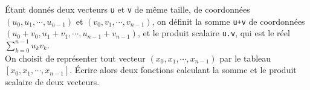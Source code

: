Étant donnés deux vecteurs \texttt{u} et \texttt{v} de même taille, de
coordonnées $( u_0,u_1,\cdots,u_{n-1})$ et
$(v_0,v_1,\cdots,v_{n-1})$, on définit la somme
\texttt{u+v} de coordonnées $(u_0+v_0,u_1+v_1,\cdots,u_{n-1}+v_{n-1})$, et le
produit scalaire \texttt{u.v}, qui est le réel
$\displaystyle\sum_{k=0}^{n-1}u_kv_k$.\\
On choisit de représenter tout vecteur $(x_0,x_1,\cdots,x_{n-1})$ par le tableau
\texttt{$[x_0,x_1,\cdots,x_{n-1}]$}. Écrire alors deux fonctions calculant la
somme et le produit scalaire de deux vecteurs.